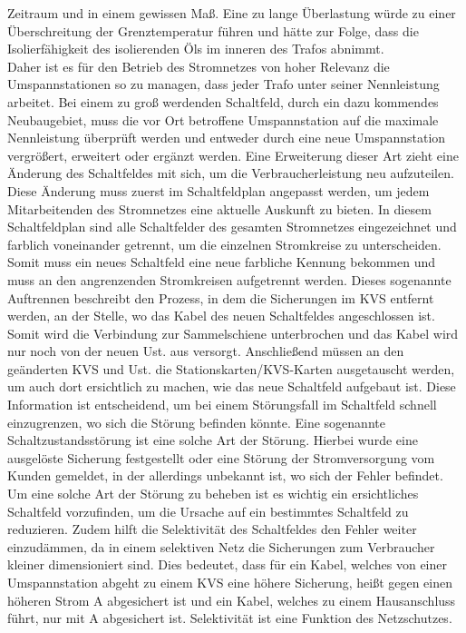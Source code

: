 Zeitraum und in einem gewissen Maß. Eine zu lange Überlastung würde zu einer Überschreitung der Grenztemperatur führen und hätte zur Folge, dass die 
Isolierfähigkeit des isolierenden Öls im inneren des Trafos abnimmt. \autocite{Werth.2016}
\\
Daher ist es für den Betrieb des Stromnetzes von hoher Relevanz die Umspannstationen so zu managen, dass jeder Trafo unter seiner Nennleistung arbeitet. Bei 
einem zu groß werdenden Schaltfeld, durch ein \zB dazu kommendes Neubaugebiet, muss die vor Ort betroffene Umspannstation auf die maximale Nennleistung 
überprüft werden und entweder durch eine neue Umspannstation vergrößert, erweitert oder ergänzt werden. Eine Erweiterung dieser Art zieht eine Änderung des 
Schaltfeldes mit sich, um die Verbraucherleistung neu aufzuteilen. Diese Änderung muss zuerst im Schaltfeldplan angepasst werden, um jedem Mitarbeitenden 
des Stromnetzes eine aktuelle Auskunft zu bieten. In diesem Schaltfeldplan sind alle Schaltfelder des gesamten Stromnetzes eingezeichnet und farblich 
voneinander getrennt, um die einzelnen Stromkreise zu unterscheiden. Somit muss ein neues Schaltfeld eine neue farbliche Kennung bekommen und muss an den 
angrenzenden Stromkreisen aufgetrennt werden. Dieses sogenannte Auftrennen beschreibt den Prozess, in dem die Sicherungen im KVS entfernt werden, an der 
Stelle, wo das Kabel des neuen Schaltfeldes angeschlossen ist. Somit wird die Verbindung zur Sammelschiene unterbrochen und das Kabel wird nur noch von der 
neuen Ust. aus versorgt. Anschließend müssen an den geänderten KVS und Ust. die Stationskarten/KVS-Karten ausgetauscht werden, um auch dort ersichtlich 
zu machen, wie das neue Schaltfeld aufgebaut ist. Diese Information ist entscheidend, um bei einem Störungsfall im Schaltfeld schnell einzugrenzen, wo 
sich die Störung befinden könnte. Eine sogenannte Schaltzustandsstörung ist \zB eine solche Art der Störung. Hierbei wurde eine ausgelöste Sicherung 
festgestellt oder eine Störung der Stromversorgung vom Kunden gemeldet, in der allerdings unbekannt ist, wo sich der Fehler befindet. Um eine solche Art 
der Störung zu beheben ist es wichtig ein ersichtliches Schaltfeld vorzufinden, um die Ursache auf ein bestimmtes Schaltfeld zu reduzieren. Zudem hilft 
die Selektivität des Schaltfeldes den Fehler weiter einzudämmen, da in einem selektiven Netz die Sicherungen zum Verbraucher kleiner dimensioniert sind. 
Dies bedeutet, dass für ein Kabel, welches von einer Umspannstation abgeht zu einem KVS eine höhere Sicherung, heißt gegen einen höheren Strom  A 
abgesichert ist und ein Kabel, welches zu einem Hausanschluss führt, nur mit  A abgesichert ist. Selektivität ist eine Funktion des Netzschutzes. 
